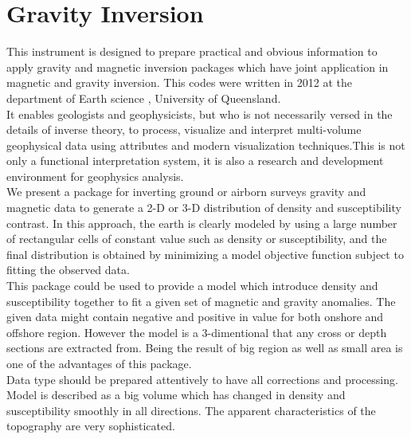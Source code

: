 \chapter{Gravity Inversion}\label{Chp:cook:gravity inversion}

This instrument is designed to prepare practical and obvious information to apply gravity and magnetic inversion packages which have joint application in magnetic and gravity inversion. This codes were written in 2012 at the department of Earth science , University of Queensland.\\
It enables geologists and geophysicists, but who is not necessarily versed in the details of inverse theory, to process, visualize and interpret multi-volume geophysical data using attributes and modern visualization techniques.This is not only a functional interpretation system, it is also a research and development environment for geophysics analysis.\\
We present a package for inverting ground or airborn surveys gravity and magnetic data to generate a 2-D or 3-D distribution of density and susceptibility contrast. In this approach, the earth is clearly modeled by using a large number of rectangular cells of constant value such as density or susceptibility, and the final distribution is obtained by minimizing a model objective function subject to fitting the observed data.\\

This package could be used to provide a model which introduce density and susceptibility together to fit a given set of magnetic and gravity anomalies. The given data might contain negative and positive in value for both onshore and offshore region. However the model is a 3-dimentional that any cross or depth sections are extracted from. Being the result of big region as well as small area is one of the advantages of this package.\\
Data type should be prepared attentively to have all corrections and processing. Model is described as a big volume which has changed in density and susceptibility smoothly in all directions. The apparent characteristics of the topography are very sophisticated.\\
\newpage


